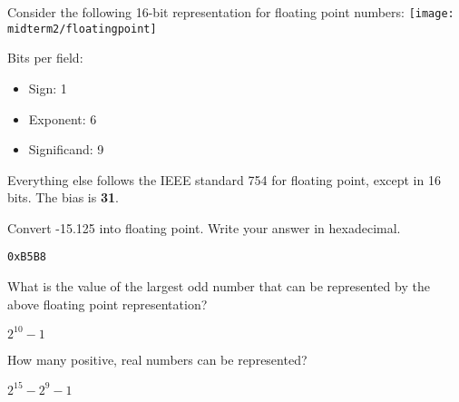 \begin{blocksection}
\question
Consider the following 16-bit representation for floating point numbers:
\texttt{[image: midterm2/floatingpoint]}

Bits per field:
\begin{itemize}
    \item Sign: 1
    \item Exponent: 6
    \item Significand: 9
\end{itemize}
Everything else follows the IEEE standard 754 for floating point, except in 16 bits.
The bias is \textbf{31}.

\question
Convert -15.125 into floating point. Write your answer in hexadecimal.
\begin{solution}
\lstinline$0xB5B8$
\end{solution}


\question
What is the value of the largest odd number that can be represented by the above floating point representation?
\begin{solution}
$2^{10} - 1$
\end{solution}


\question
How many positive, real numbers can be represented?
\begin{solution}
$2^{15} - 2^9 - 1$
\end{solution}

\end{blocksection}